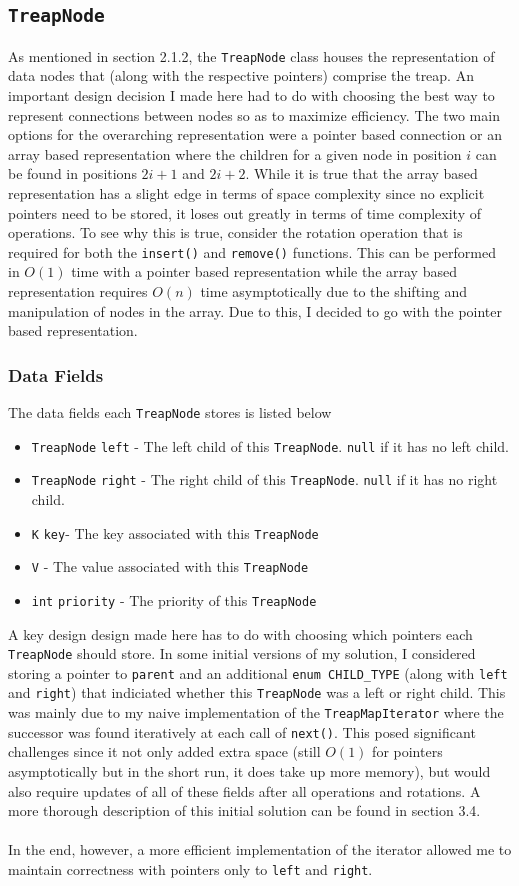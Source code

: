 \documentclass[11pt]{article}
\def\tt{\texttt}
\def\ins{\tt{insert()}}
\def\rem{\tt{remove()}}
\def\tn{\tt{TreapNode}}
\def\tmi{\tt{TreapMapIterator}}
\def\key{\tt{key}}
\begin{document}
\subsection{\tn}
As mentioned in section 2.1.2, the \tn{} class houses the representation of data nodes that (along with the respective pointers) comprise the treap. An important design decision I made here had to do with choosing the best way to represent connections between nodes so as to maximize efficiency. The two main options for the overarching representation were a pointer based connection or an array based representation where the children for a given node in position $i$ can be found in positions $2i+1$ and $2i+2$. While it is true that the array based representation has a slight edge in terms of space complexity since no explicit pointers need to be stored, it loses out greatly in terms of time complexity of operations. To see why this is true, consider the rotation operation that is required for both the \ins{} and \rem{} functions. This can be performed in $O(1)$ time with a pointer based representation while the array based representation requires $O(n)$ time asymptotically due to the shifting and manipulation of nodes in the array. Due to this, I decided to go with the pointer based representation. 
\subsubsection{Data Fields}
The data fields each \tn{} stores is listed below
\begin{itemize}
	\item \tn{} \tt{left} - The left child of this \tn{}. \tt{null} if it has no left child.
	\item \tn{} \tt{right} - The right child of this \tn{}. \tt{null} if it has no right child.
	\item \tt{K} \key - The key associated with this \tn{}
	\item \tt{V} \value - The value associated with this \tn{}
	\item \tt{int} \tt{priority} - The priority of this \tn{}
\end{itemize}
A key design design made here has to do with choosing which pointers each \tn{} should store. In some initial versions of my solution, I considered storing a pointer to \tt{parent} and an additional \tt{enum CHILD\_TYPE} (along with \tt{left} and \tt{right}) that indiciated whether this \tn{} was a left or right child. This was mainly due to my naive implementation of the \tmi{} where the successor was found iteratively at each call of  \tt{next()}. This posed significant challenges since it not only added extra space (still $O(1)$ for pointers asymptotically but in the short run, it does take up more memory), but would also require updates of all of these fields after all operations and rotations. A more thorough description of this initial solution can be found in section 3.4. \\ \\
In the end, however, a more efficient implementation of the iterator allowed me to maintain correctness with pointers only to \tt{left} and \tt{right}.
\end{document}
